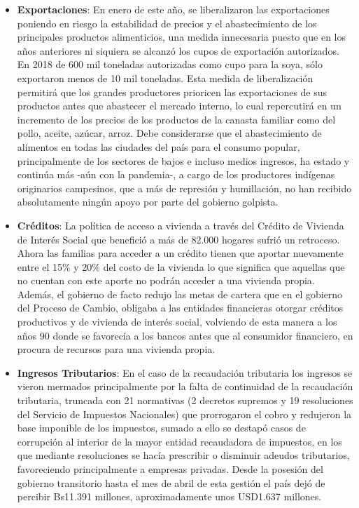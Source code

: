 \documentclass[a4paper, nobind]{templates/ociamthesis}
\begin{document}
\begin{itemize}
\item
  \textbf{Exportaciones}: En enero de este año, se liberalizaron las exportaciones poniendo en riesgo la estabilidad de precios y el abastecimiento de los principales productos alimenticios, una medida innecesaria puesto que en los años anteriores ni siquiera se alcanzó los cupos de exportación autorizados. En 2018 de 600 mil toneladas autorizadas como cupo para la soya, sólo exportaron menos de 10 mil toneladas. Esta medida de liberalización permitirá que los grandes productores prioricen las exportaciones de sus productos antes que abastecer el mercado interno, lo cual repercutirá en un incremento de los precios de los productos de la canasta familiar como del pollo, aceite, azúcar, arroz.
  Debe considerarse que el abastecimiento de alimentos en todas las ciudades del país para el consumo popular, principalmente de los sectores de bajos e incluso medios ingresos, ha estado y continúa más -aún con la pandemia-, a cargo de los productores indígenas originarios campesinos, que a más de represión y humillación, no han recibido absolutamente ningún apoyo por parte del gobierno golpista.
\item
  \textbf{Créditos}: La política de acceso a vivienda a través del Crédito de Vivienda de Interés Social que benefició a más de 82.000 hogares sufrió un retroceso. Ahora las familias para acceder a un crédito tienen que aportar nuevamente entre el 15\% y 20\% del costo de la vivienda lo que significa que aquellas que no cuentan con este aporte no podrán acceder a una vivienda propia. Además, el gobierno de facto redujo las metas de cartera que en el gobierno del Proceso de Cambio, obligaba a las entidades financieras otorgar créditos productivos y de vivienda de interés social, volviendo de esta manera a los años 90 donde se favorecía a los bancos antes que al consumidor financiero, en procura de recursos para una vivienda propia.
\item
  \textbf{Ingresos Tributarios}: En el caso de la recaudación tributaria los ingresos se vieron mermados principalmente por la falta de continuidad de la recaudación tributaria, truncada con 21 normativas (2 decretos supremos y 19 resoluciones del Servicio de Impuestos Nacionales) que prorrogaron el cobro y redujeron la base imponible de los impuestos, sumado a ello se destapó casos de corrupción al interior de la mayor entidad recaudadora de impuestos, en los que mediante resoluciones se hacía prescribir o disminuir adeudos tributarios, favoreciendo principalmente a empresas privadas. Desde la posesión del gobierno transitorio hasta el mes de abril de esta gestión el país dejó de percibir Bs11.391 millones, aproximadamente unos USD1.637 millones.

\end{itemize}
\end{document}
